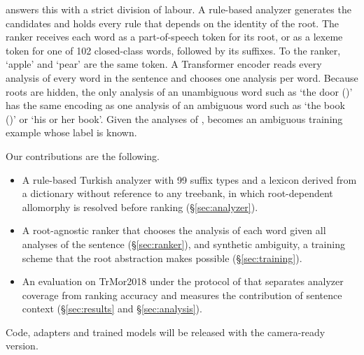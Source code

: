 \savyar{} answers this with a strict division of labour. A rule-based analyzer generates the candidates and holds every rule that depends on the identity of the root. The ranker receives each word as a part-of-speech token for its root, or as a lexeme token for one of 102 closed-class words, followed by its suffixes. To the ranker,  `apple' and  `pear' are the same token. A Transformer encoder \citep{vaswani-etal-2017-attention} reads every analysis of every word in the sentence and chooses one analysis per word. Because roots are hidden, the only analysis of an unambiguous word such as  `the door ()' has the same encoding as one analysis of an ambiguous word such as  `the book ()' or `his or her book'. Given the analyses of ,  becomes an ambiguous training example whose label is known.

Our contributions are the following.
\begin{itemize}
\item A rule-based Turkish analyzer with 99 suffix types and a lexicon derived from a dictionary without reference to any treebank, in which root-dependent allomorphy is resolved before ranking (\S\ref{sec:analyzer}).
\item A root-agnostic ranker that chooses the analysis of each word given all analyses of the sentence (\S\ref{sec:ranker}), and synthetic ambiguity, a training scheme that the root abstraction makes possible (\S\ref{sec:training}).
\item An evaluation on TrMor2018 under the protocol of \citet{akyurek-etal-2019-morphological} that separates analyzer coverage from ranking accuracy and measures the contribution of sentence context (\S\ref{sec:results} and \S\ref{sec:analysis}).
\end{itemize}

\noindent Code, adapters and trained models will be released with the camera-ready version.
